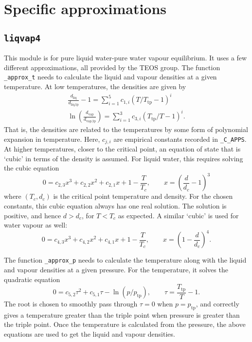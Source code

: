 \documentclass{article}
\newcommand{\liq}{\text{liq}}
\newcommand{\vap}{\text{vap}}
\newcommand{\tp}{\text{tp}}
\begin{document}
\section{Specific approximations}


\subsection{\texttt{liqvap4}}

This module is for pure liquid water-pure water vapour equilibrium. It uses a few different approximations, all provided by the TEOS group. The function \texttt{\_approx\_t} needs to calculate the liquid and vapour densities at a given temperature. At low temperatures, the densities are given by
\begin{gather*}
    \frac{d_{\liq}}{d_{\liq,\tp}} - 1 = \sum_{i=1}^5 c_{1,i} (T/T_{\tp} - 1)^i \\
    \ln\left( \frac{d_{\vap}}{d_{\vap,\tp}} \right) = \sum_{i=1}^3 c_{3,i} (T_{\tp}/T - 1)^i.
\end{gather*}
That is, the densities are related to the temperatures by some form of polynomial expansion in temperature. Here, $c_{j,i}$ are empirical constants recorded in \texttt{\_C\_APPS}. At higher temperatures, closer to the critical point, an equation of state that is `cubic' in terms of the density is assumed. For liquid water, this requires solving the cubic equation
\begin{equation*}
    0 = c_{2,3} x^3 + c_{2,2} x^2 + c_{2,1} x + 1 - \frac{T}{T_c}, \qquad x = \left( \frac{d}{d_c} - 1 \right)^3
\end{equation*}
where $(T_c,d_c)$ is the critical point temperature and density. For the chosen constants, this cubic equation always has one real solution. The solution is positive, and hence $d>d_c$, for $T<T_c$ as expected. A similar `cubic' is used for water vapour as well:
\begin{equation*}
    0 = c_{4,3} x^3 + c_{4,2} x^2 + c_{4,1} x + 1 - \frac{T}{T_c}, \qquad x = \left(1 - \frac{d}{d_c} \right)^4.
\end{equation*}

The function \texttt{\_approx\_p} needs to calculate the temperature along with the liquid and vapour densities at a given pressure. For the temperature, it solves the quadratic equation
\begin{equation*}
    0 = c_{5,2} \tau^2 + c_{5,1} \tau - \ln(p/p_{\tp}), \qquad \tau = \frac{T_{\tp}}{T} - 1.
\end{equation*}
The root is chosen to smoothly pass through $\tau=0$ when $p=p_{\tp}$, and correctly gives a temperature greater than the triple point when pressure is greater than the triple point. Once the temperature is calculated from the pressure, the above equations are used to get the liquid and vapour densities.
\end{document}
